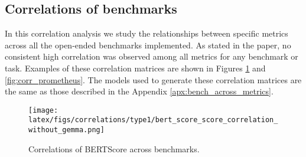\subsection{Correlations of benchmarks} \label{apx:metrics_across_bench}


In this correlation analysis we study the relationships between specific metrics across all the open-ended benchmarks implemented. As stated in the paper, no consistent high correlation was observed among all metrics for any benchmark or task. Examples of these correlation matrices are shown in Figures \ref{fig:corr_bert_acros_bench} and \ref{fig:corr_prometheus}. The models used to generate these correlation matrices are the same as those described in the Appendix \ref{apx:bench_across_metrics}.








\begin{figure}[t]
    \centering
    \texttt{[image: latex/figs/correlations/type1/bert\_score\_score\_correlation\_without\_gemma.png]}
    \caption{Correlations of BERTScore across benchmarks.}
    \label{fig:corr_bert_acros_bench}
\end{figure} 

